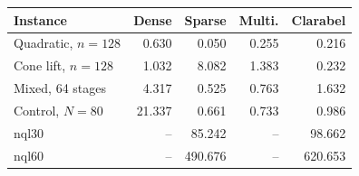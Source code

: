\begin{tabular}{lrrrr}
\toprule
Instance & Dense & Sparse & Multi. & Clarabel\\
\midrule
Quadratic, $n=128$ & 0.630 & 0.050 & 0.255 & 0.216\\
Cone lift, $n=128$ & 1.032 & 8.082 & 1.383 & 0.232\\
Mixed, 64 stages & 4.317 & 0.525 & 0.763 & 1.632\\
Control, $N=80$ & 21.337 & 0.661 & 0.733 & 0.986\\
nql30 & -- & 85.242 & -- & 98.662\\
nql60 & -- & 490.676 & -- & 620.653\\
\bottomrule
\end{tabular}
